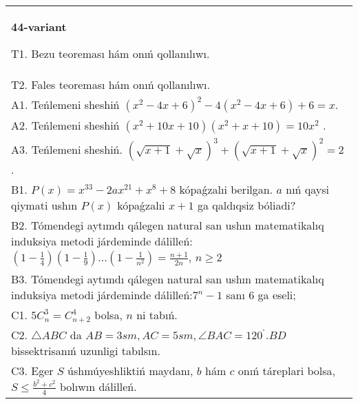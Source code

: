 \documentclass{article}
\begin{document}
\begin{tabular}{m{17cm}}
\textbf{44-variant}
\newline

T1. Bezu teoreması hám onıń qollanılıwı. \\
T2. Fales teoreması hám onıń qollanılıwı. \\
A1. Teńlemeni sheshiń \(\left( x^{2} - 4x + 6 \right)^{2} - 4\left( x^{2} - 4x + 6 \right) + 6 = x\). \\
A2. Teńlemeni sheshiń \(\left( x^{2} + 10x + 10 \right)\left( x^{2} + x + 10 \right) = 10x^{2}\) . \\
A3. Teńlemeni sheshiń. \((\sqrt{x + 1} + \sqrt{x})^{3} + (\sqrt{x + 1} + \sqrt{x})^{2} = 2\). \\
B1. \(P(x) = x^{33} - 2ax^{21} + x^{8} + 8\) kópaǵzalıi berilgan. \(a\) nıń qaysi qiymati ushın \(P(x)\) kópaǵzalıi \(x + 1\) ga qaldıqsiz bóliadi? \\
B2. Tómendegi aytımdı qálegen natural san ushın matematikalıq induksiya metodi járdeminde dálilleń: \(\left( 1 - \frac{1}{4} \right)\left( 1 - \frac{1}{9} \right)...\left( 1 - \frac{1}{n^{2}} \right) = \frac{n + 1}{2n}\), \(n \geq 2\) \\
B3. Tómendegi aytımdı qálegen natural san ushın matematikalıq induksiya metodi járdeminde dálilleń:\(7^{n} - 1\) sanı 6 ga eseli; \\
C1. \(5C_{n}^{3} = C_{n + 2}^{4}\) bolsa, \(n\) ni tabıń. \\
C2. \(\bigtriangleup ABC\) da \(AB = 3sm,AC = 5sm,\angle BAC = 120^{{^\circ}}.BD\) bissektrisanıń uzunligi tabılsın. \\
C3. Eger \(S\) úshmúyeshliktiń maydanı, \(b\) hám \(c\) onıń táreplari bolsa, \(S \leq \frac{b^{2} + c^{2}}{4}\) bolıwın dálilleń. \\

\end{tabular}
\vspace{1cm}
\end{document}

